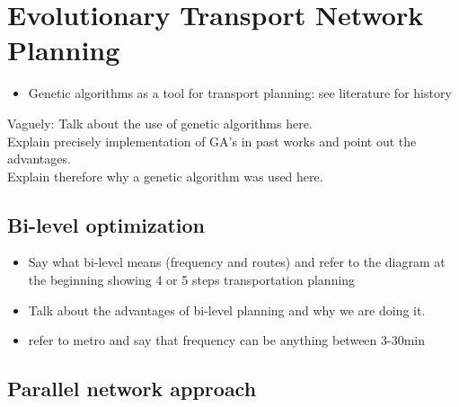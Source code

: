 %
\newpage
\section{Evolutionary Transport Network Planning}
\label{ch:evo}

\begin{itemize}
	\item Genetic algorithms as a tool for transport planning: see literature for history
\end{itemize}



Vaguely:
Talk about the use of genetic algorithms here.\\
Explain precisely implementation of GA's in past works and point out the advantages.\\
Explain therefore why a genetic algorithm was used here.

\subsection{Bi-level optimization}


\begin{itemize}
	\item Say what bi-level means (frequency and routes) and refer to the diagram at the beginning showing 4 or 5 steps transportation planning
	\item Talk about the advantages of bi-level planning and why we are doing it.
	\item refer to metro and say that frequency can be anything between 3-30min
\end{itemize}

\subsection{Parallel network approach}


